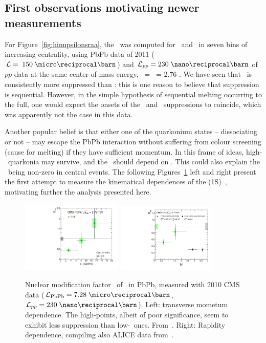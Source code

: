 \subsection{First observations motivating newer measurements}
\label{subsec:firstobs}

For Figure~\ref{fig:hinupsilonsraa},
the \RAA\ was computed for \PgUa\ and \PgUb\ in seven bins of
increasing centrality, using PbPb data of 2011 ($\mathcal{L} = \; 150
\;\invmub$) and $\mathcal{L}_{pp} = 230 \;
\invnb$ of $pp$ data at the same center of mass energy, \s\ = \snn\
= 2.76 \TeV. We have seen that \PgUb\ is consistently more suppressed
than \PgUa: this is one reason to believe that suppression is sequential. 
However, in the simple hypothesis of sequential melting
occurring to the full, one would expect the onsets of the \PgUb\ and \PgUa\ suppressions to coincide, which was apparently not the case in this data. 

Another popular belief is that either one of the quarkonium
states -- dissociating or not -- may escape the PbPb interaction
without suffering from colour screening (cause for melting) if they have sufficient momentum. In this frame of
ideas, high-\pt\ quarkonia may survive, and the \RAA\
should depend on \pt. This could also explain the \PgUb\ being
non-zero in central events. The following Figures~\ref{fig:raarap2010} left and
right present the first attempt to measure the kinematical dependences of the \PgU(1S)~\cite{torsten}, motivating further the analysis presented here. 

\begin{figure}
\begin{center}
\includegraphics[width=0.43\textwidth]{Chapters/aYield/upsilon_RAA_pt.pdf}
\includegraphics[width=0.42\textwidth]{Chapters/aYield/Raa_Y1S_rap_CMSaliceFinal.pdf}
\caption{Nuclear modification factor \RAA\ of \PgUa\ in PbPb, measured
  with 2010 CMS data ($\mathcal{L}_{\rm PbPb} = 7.28
\; \invmub$, $\mathcal{L}_{pp} = 230
\; \invnb$). Left: transverse mometum dependence. The high-\pt points, albeit of poor significance, seem to
exhibit less suppression than low-\pt\ ones. From~\cite{torsten}. Right:
Rapidity dependence, compiling also ALICE data from~\cite{ALICEUpsilonHI}.} 
\label{fig:raarap2010}
\end{center}
\end{figure}

